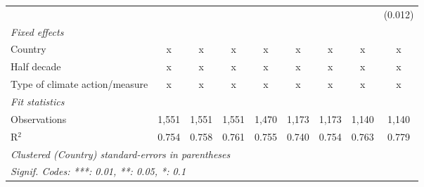 \begin{table}[htbp]
\begin{tabular}{lcccccccc}
                                                                          &              &               &               &               &              &               &               & (0.012)\\   
      \emph{Fixed effects}\\
      Country                                                             & x            & x             & x             & x             & x            & x             & x             & x\\  
      Half decade                                                         & x            & x             & x             & x             & x            & x             & x             & x\\  
      Type of climate action/measure                                      & x            & x             & x             & x             & x            & x             & x             & x\\  
      \midrule \emph{Fit statistics}\\
      Observations                                                        & 1,551        & 1,551         & 1,551         & 1,470         & 1,173        & 1,173         & 1,140         & 1,140\\  
      R$^2$                                                               & 0.754        & 0.758         & 0.761         & 0.755         & 0.740        & 0.754         & 0.763         & 0.779\\  
      \midrule
      \multicolumn{9}{l}{\emph{Clustered (Country) standard-errors in parentheses}}\\
      \multicolumn{9}{l}{\emph{Signif. Codes: ***: 0.01, **: 0.05, *: 0.1}}\\
   \end{tabular}
\end{table}


